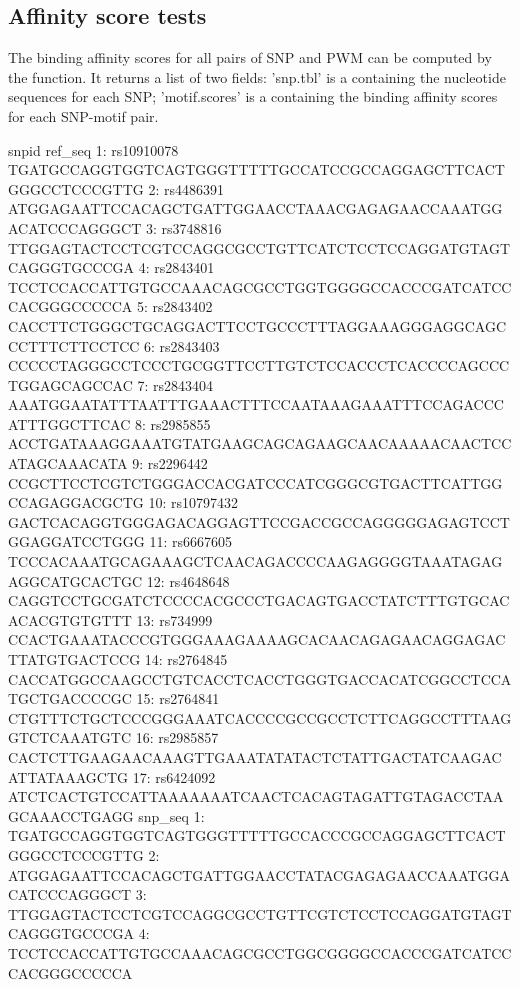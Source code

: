 \documentclass[a4paper,10pt]{article}
\begin{document}
\subsection{Affinity score tests}

The binding affinity scores for all pairs of SNP and PWM can be computed by the  function. It returns a list of two fields: 'snp.tbl' is a  containing the nucleotide sequences for each SNP; 'motif.scores' is a  containing the binding affinity scores for each SNP-motif pair.

\begin{Schunk}
\begin{Soutput}
         snpid                                                       ref_seq
 1: rs10910078 TGATGCCAGGTGGTCAGTGGGTTTTTGCCATCCGCCAGGAGCTTCACTGGGCCTCCCGTTG
 2:  rs4486391 ATGGAGAATTCCACAGCTGATTGGAACCTAAACGAGAGAACCAAATGGACATCCCAGGGCT
 3:  rs3748816 TTGGAGTACTCCTCGTCCAGGCGCCTGTTCATCTCCTCCAGGATGTAGTCAGGGTGCCCGA
 4:  rs2843401 TCCTCCACCATTGTGCCAAACAGCGCCTGGTGGGGCCACCCGATCATCCCACGGGCCCCCA
 5:  rs2843402 CACCTTCTGGGCTGCAGGACTTCCTGCCCTTTAGGAAAGGGAGGCAGCCCTTTCTTCCTCC
 6:  rs2843403 CCCCCTAGGGCCTCCCTGCGGTTCCTTGTCTCCACCCTCACCCCAGCCCTGGAGCAGCCAC
 7:  rs2843404 AAATGGAATATTTAATTTGAAACTTTCCAATAAAGAAATTTCCAGACCCATTTGGCTTCAC
 8:  rs2985855 ACCTGATAAAGGAAATGTATGAAGCAGCAGAAGCAACAAAAACAACTCCATAGCAAACATA
 9:  rs2296442 CCGCTTCCTCGTCTGGGACCACGATCCCATCGGGCGTGACTTCATTGGCCAGAGGACGCTG
10: rs10797432 GACTCACAGGTGGGAGACAGGAGTTCCGACCGCCAGGGGGAGAGTCCTGGAGGATCCTGGG
11:  rs6667605 TCCCACAAATGCAGAAAGCTCAACAGACCCCAAGAGGGGTAAATAGAGAGGCATGCACTGC
12:  rs4648648 CAGGTCCTGCGATCTCCCCACGCCCTGACAGTGACCTATCTTTGTGCACACACGTGTGTTT
13:   rs734999 CCACTGAAATACCCGTGGGAAAGAAAAGCACAACAGAGAACAGGAGACTTATGTGACTCCG
14:  rs2764845 CACCATGGCCAAGCCTGTCACCTCACCTGGGTGACCACATCGGCCTCCATGCTGACCCCGC
15:  rs2764841 CTGTTTCTGCTCCCGGGAAATCACCCCGCCGCCTCTTCAGGCCTTTAAGGTCTCAAATGTC
16:  rs2985857 CACTCTTGAAGAACAAAGTTGAAATATATACTCTATTGACTATCAAGACATTATAAAGCTG
17:  rs6424092 ATCTCACTGTCCATTAAAAAAATCAACTCACAGTAGATTGTAGACCTAAGCAAACCTGAGG
                                                          snp_seq
 1: TGATGCCAGGTGGTCAGTGGGTTTTTGCCACCCGCCAGGAGCTTCACTGGGCCTCCCGTTG
 2: ATGGAGAATTCCACAGCTGATTGGAACCTATACGAGAGAACCAAATGGACATCCCAGGGCT
 3: TTGGAGTACTCCTCGTCCAGGCGCCTGTTCGTCTCCTCCAGGATGTAGTCAGGGTGCCCGA
 4: TCCTCCACCATTGTGCCAAACAGCGCCTGGCGGGGCCACCCGATCATCCCACGGGCCCCCA

\end{Soutput}
\end{Schunk}
\end{document}
